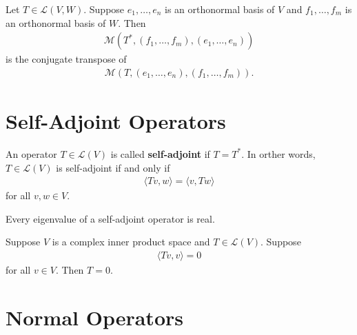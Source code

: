 \documentclass{memoir}
\begin{document}
\begin{prop}
	Let \( T \in \mathcal{L}(V,W)\). Suppose \(e_1,\ldots,e_n\) is an orthonormal basis of \(V\) and \(f_1,\ldots,f_m\) is an orthonormal basis of \(W\). Then
	\begin{align*}
		 \mathcal{M}(T^{*}, (f_1,\ldots,f_m), (e_1,\ldots,e_n))
	\end{align*}
	is the conjugate transpose of
	\begin{align*}
		\mathcal{M}(T,(e_1,\ldots,e_n),(f_1,\ldots,f_m)).
	\end{align*}
\end{prop}
\section{Self-Adjoint Operators}
\label{sec:self_adjoint_operators}

\begin{defn}
	An operator \(T \in \mathcal{L}(V)\) is called \textbf{self-adjoint} if \(T = T^{*}\). In orther words, \(T \in \mathcal{L}(V)\) is self-adjoint if and only if
	\begin{align*}
		 \langle Tv, w \rangle = \langle v, Tw \rangle 
	\end{align*}
for all \(v,w \in V\).
\end{defn}
\begin{cor}
	Every eigenvalue of a self-adjoint operator is real.
\end{cor}
\begin{cor}
	Suppose \(V\) is a complex inner product space and \(T \in \mathcal{L}(V)\). Suppose
	\begin{align*}
 \langle Tv, v \rangle = 0
	\end{align*}
	for all \(v \in V\). Then \(T = 0\).
\end{cor}
\section{Normal Operators}
\label{sec:normal_operators}
\end{document}
